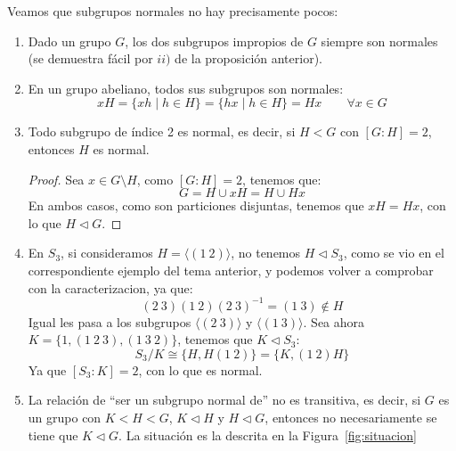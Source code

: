 \begin{ejemplo}
    Veamos que subgrupos normales no hay precisamente pocos:
    \begin{enumerate}
        \item Dado un grupo $G$, los dos subgrupos impropios de $G$ siempre son normales (se demuestra fácil por $ii)$ de la proposición anterior).
        \item En un grupo abeliano, todos sus subgrupos son normales:
            \begin{equation*}
                xH = \{xh \mid h \in H\} = \{hx \mid h \in H\} = Hx \qquad \forall x\in G
            \end{equation*}
        \item Todo subgrupo de índice 2 es normal, es decir, si $H<G$ con $[G:H] = 2$, entonces $H$ es normal.
            \begin{proof}
                Sea $x\in G\setminus H$, como $[G:H] = 2$, tenemos que:
                \begin{equation*}
                    G = H\cup xH = H\cup Hx
                \end{equation*}
                En ambos casos, como son particiones disjuntas, tenemos que $xH = Hx$, con lo que $H\lhd G$.
            \end{proof}
        \item En $S_3$, si consideramos $H = \langle (1\ 2) \rangle $, no tenemos $H\lhd S_3$, como se vio en el correspondiente ejemplo del tema anterior, y podemos volver a comprobar con la caracterizacion, ya que:
            \begin{equation*}
                (2\ 3)(1\ 2){(2\ 3)}^{-1} = (1\ 3)\notin H
            \end{equation*}
            Igual les pasa a los subgrupos $\langle (2\ 3) \rangle $ y $\langle (1\ 3) \rangle $. Sea ahora $K = \{1, (1\ 2\ 3), (1\ 3\ 2)\}$, tenemos que $K\lhd S_3$:
            \begin{equation*}
                S_3 / K \cong \{H, H(1\ 2)\} = \{K, (1\ 2)H\}
            \end{equation*}
            Ya que $[S_3 : K] = 2$, con lo que es normal.
        \item La relación de ``ser un subgrupo normal de'' no es transitiva, es decir, si $G$ es un grupo con $K<H<G$, $K\lhd H$ y $H\lhd G$, entonces no necesariamente se tiene que $K\lhd G$. La situación es la descrita en la Figura~\ref{fig:situacion}
            \begin{figure}[H]
                \centering
\end{figure}
\end{enumerate}
\end{ejemplo}

